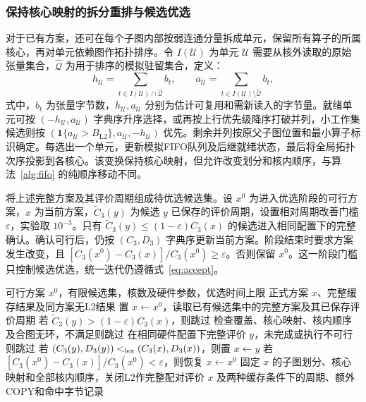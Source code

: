 \subsubsection{保持核心映射的拆分重排与候选优选}
\label{subsec:q3_selection}
对于已有方案，还可在每个子图内部按弱连通分量拆成单元，保留所有算子的所属核心，再对单元依赖图作拓扑排序。令 $I(\mathcal U)$ 为单元 $\mathcal U$ 需要从核外读取的原始张量集合，$\widehat{\mathcal Q}$ 为用于排序的模拟驻留集合，定义：
\begin{equation}
 h_{\mathcal U}=\sum_{t\in I(\mathcal U)\cap\widehat{\mathcal Q}}b_t,\qquad
 a_{\mathcal U}=\sum_{t\in I(\mathcal U)\setminus\widehat{\mathcal Q}}b_t,
 \label{eq:q3_unit_bytes}
\end{equation}
\noindent 式中，$b_t$ 为张量字节数，$h_{\mathcal U},a_{\mathcal U}$ 分别为估计可复用和需新读入的字节量。就绪单元可按 $(-h_{\mathcal U},a_{\mathcal U})$ 字典序升序选择，或再按上行优先级降序打破并列，小工作集候选则按 $(\mathbf1\{a_{\mathcal U}>B_{\mathrm{L2}}\},a_{\mathcal U},-h_{\mathcal U})$ 优先。剩余并列按原父子图位置和最小算子标识确定。每选出一个单元，更新模拟FIFO队列及后继就绪状态，最后将全局拓扑次序投影到各核心。该变换保持核心映射，但允许改变划分和核内顺序，与算法~\ref{alg:fifo} 的纯顺序移动不同。

将上述完整方案及其评价周期组成待优选候选集。设 $x^0$ 为进入优选阶段的可行方案，$x$ 为当前方案，$\widetilde C_3(y)$ 为候选 $y$ 已保存的评价周期，设置相对周期改善门槛 $\varepsilon$，实验取 $10^{-3}$。只有 $\widetilde C_3(y)\le(1-\varepsilon)C_3(x)$ 的候选进入相同配置下的完整确认。确认可行后，仍按 $(C_3,D_3)$ 字典序更新当前方案。阶段结束时要求方案发生改变，且 $[C_3(x^0)-C_3(x)]/C_3(x^0)\ge\varepsilon$。否则保留 $x^0$。这一阶段门槛只控制候选优选，统一迭代仍遵循式~\eqref{eq:accept}。
\begin{algorithm}[htbp]
\caption{第三问的多粒度候选优选与同方案配对}\label{alg:q3_portfolio}
\small
\begin{algorithmic}[1]
\Require 可行方案 $x^0$，有限候选集，核数及硬件参数，优选时间上限
\Ensure 正式方案 $x$、完整缓存结果及同方案无L2结果
\State 置 $x\gets x^0$，读取已有候选集中的完整方案及其已保存评价周期
 \State 若 $\widetilde C_3(y)>(1-\varepsilon)C_3(x)$，则跳过
 \State 检查覆盖、核心映射、核内顺序及合图无环，不满足则跳过
 \State 在相同硬件配置下完整评价 $y$，未完成或执行不可行则跳过
 \State 若 $(C_3(y),D_3(y))<_{\rm lex}(C_3(x),D_3(x))$，则置 $x\gets y$
\EndFor
\State 若 $[C_3(x^0)-C_3(x)]/C_3(x^0)<\varepsilon$，则恢复 $x\gets x^0$
\State 固定 $x$ 的子图划分、核心映射和全部核内顺序，关闭L2作完整配对评价
\State \Return $x$ 及两种缓存条件下的周期、额外COPY和命中字节记录
\end{algorithmic}
\end{algorithm}



